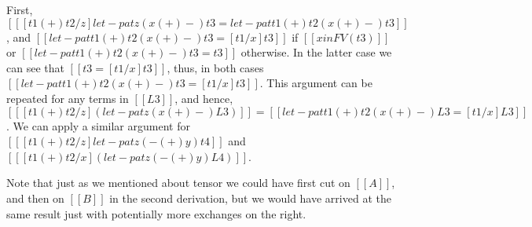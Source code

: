 \documentclass{article}
\begin{document}
First, $[[ [t1 (+) t2/z]{let-pat z (x (+) -) t3} = let-pat {t1 (+) t2}
(x (+) -) t3]]$, and $[[let-pat {t1 (+) t2} (x (+) -) t3 = [t1/x]t3]]$
if $[[x in FV(t3)]]$ or $[[let-pat {t1 (+) t2} (x (+) -) t3 = t3]]$ otherwise.
In the latter case we can see that $[[t3 = [t1/x]t3]]$, thus, in both cases
$[[let-pat {t1 (+) t2} (x (+) -) t3 = [t1/x]t3]]$.  This argument can be repeated for any terms in $[[L3]]$,
and hence, $[[ [t1 (+) t2/z](let-pat z (x (+) -) L3)]] = [[let-pat {t1 (+) t2} (x (+) -) L3 = [t1/x]L3]]$.
We can apply a similar argument for $[[ [t1 (+) t2/z]{let-pat z (- (+) y) t4}]]$ and 
$[[ [t1 (+) t2/x](let-pat z (- (+) y) L4)]]$.  

Note that just as we mentioned about tensor we could have first cut on
$[[A]]$, and then on $[[B]]$ in the second derivation, but we would
have arrived at the same result just with potentially more exchanges
on the right.
\end{document}
